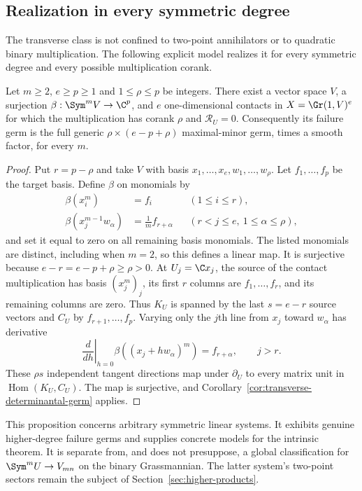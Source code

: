\subsection{Realization in every symmetric degree}
The transverse class is not confined to two-point annihilators or
to quadratic binary multiplication. The following explicit model
realizes it for every symmetric degree and every possible
multiplication corank.

\begin{proposition}
\label{prop:every-degree-realization}
Let $m\ge2$, $e\ge p\ge1$ and $1\le\rho\le p$ be integers.
There exist a vector space $V$, a surjection
$\beta:\Sym^mV\to\C^p$, and $e$ one-dimensional contacts in
$X=\Gr(1,V)^e$ for which the multiplication has corank $\rho$
and $\mathcal R_U=0$. Consequently its failure germ is the full
generic $\rho\times(e-p+\rho)$ maximal-minor germ, times a
smooth factor, for every $m$.
\end{proposition}
\begin{proof}
Put $r=p-\rho$ and take $V$ with basis
$x_1,\ldots,x_e,w_1,\ldots,w_\rho$. Let
$f_1,\ldots,f_p$ be the target basis. Define $\beta$ on monomials by
\begin{equation}\label{eq:every-degree-realization}
 \begin{aligned}
 \beta(x_i^m)&=f_i &&(1\le i\le r),\\
 \beta(x_j^{m-1}w_\alpha)&=\frac1m f_{r+\alpha}
                         &&(r<j\le e,\ 1\le\alpha\le\rho),
 \end{aligned}
\end{equation}
and set it equal to zero on all remaining basis monomials. The
listed monomials are distinct, including when $m=2$, so this defines
a linear map. It is surjective because $e-r=e-p+\rho\ge\rho>0$.
At $U_j=\C x_j$, the source of the contact multiplication has basis
$(x_j^m)_j$, its first $r$ columns are $f_1,\ldots,f_r$, and its
remaining columns are zero. Thus $K_U$ is spanned by the last
$s=e-r$ source vectors and $C_U$ by $f_{r+1},\ldots,f_p$.
Varying only the $j$th line from $x_j$ toward $w_\alpha$ has derivative
\[
 \left.\frac{d}{dh}\right|_{h=0}
       \beta((x_j+hw_\alpha)^m)=f_{r+\alpha},\qquad j>r.
\]
These $\rho s$ independent tangent directions map under
$\partial_U$ to every matrix unit in $\operatorname{Hom}(K_U,C_U)$.
The map is surjective, and Corollary~\ref{cor:transverse-determinantal-germ}
applies.
\end{proof}
This proposition concerns arbitrary symmetric linear systems. It
exhibits genuine higher-degree failure germs and supplies concrete
models for the intrinsic theorem. It is separate from, and does not
presuppose, a global classification for $\Sym^mU\to V_{mn}$ on the
binary Grassmannian. The latter system's two-point sectors remain
the subject of Section~\ref{sec:higher-products}.

